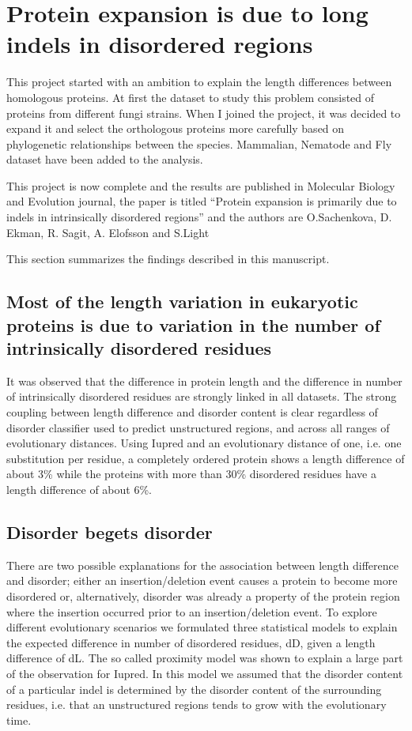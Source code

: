 \documentclass[11pt, a4paper,oneside]{report}
\begin{document}
\section{Protein expansion is due to long indels in disordered regions}
This project started with an ambition to explain the length differences between homologous proteins.  At first the dataset to study this problem consisted of proteins from different fungi strains. When I joined the project, it was decided to expand it and select the orthologous proteins more carefully based on phylogenetic relationships between the species. Mammalian, Nematode and Fly dataset have been added to the analysis. 

This project is now complete and the results are published in Molecular Biology and Evolution journal, the paper is titled “Protein expansion is primarily due to indels in intrinsically disordered regions” and the authors are O.Sachenkova, D. Ekman, R. Sagit, A. Elofsson and S.Light\cite{Light2013}

This section summarizes the findings described in this manuscript. 
\subsection{Most of the length variation in eukaryotic proteins is due to variation in the number of intrinsically disordered residues}
It was observed that the difference in protein length and the difference in number of intrinsically disordered residues are strongly linked in all datasets. The strong coupling between length difference and disorder content is clear regardless of disorder classifier used to predict unstructured regions, and across all ranges of evolutionary distances. Using Iupred and an evolutionary distance of one, i.e. one substitution per residue, a completely ordered protein
shows a length difference of about 3\% while the proteins with more than 30\% disordered residues have a length difference of about 6\%.

\subsection{Disorder begets disorder}
There are two possible explanations for the association between length difference and disorder; either an insertion/deletion event causes a protein to become more disordered or, alternatively, disorder was already a property of the protein region where the insertion occurred prior to an insertion/deletion event. To explore different evolutionary scenarios we formulated three statistical models to explain the expected difference in number of disordered residues, dD,
given a length difference of dL. The so called proximity model was shown to explain a large part of the observation for Iupred. In this model we assumed that the disorder content of a particular indel is determined by the disorder content of the surrounding residues, i.e. that an unstructured regions tends to grow with the evolutionary time. 
\end{document}
